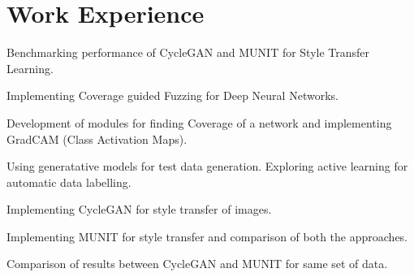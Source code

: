 \documentclass[a4paper]{deedy-resume-openfont}
\begin{document}
\begin{minipage}[t]{0.33\textwidth}

%
%

\end{minipage} 
\hfill
\begin{minipage}[t]{0.66\textwidth} 




\section{Work Experience}
\vspace{\topsep} %
\begin{tightemize}
\item Benchmarking performance of CycleGAN and MUNIT for Style Transfer Learning.
\item Implementing Coverage guided Fuzzing for Deep Neural Networks.
\item Development of modules for finding Coverage of a network and implementing GradCAM (Class Activation Maps).
\end{tightemize}

\begin{tightemize}
\item Using generatative models for test data generation. Exploring active learning for automatic data labelling.
\item Implementing CycleGAN for style transfer of images. 
\item Implementing MUNIT for style transfer and comparison of both the approaches.
\item Comparison of results between CycleGAN and MUNIT for same set of data.
\end{tightemize}


\end{minipage}
\end{document}
